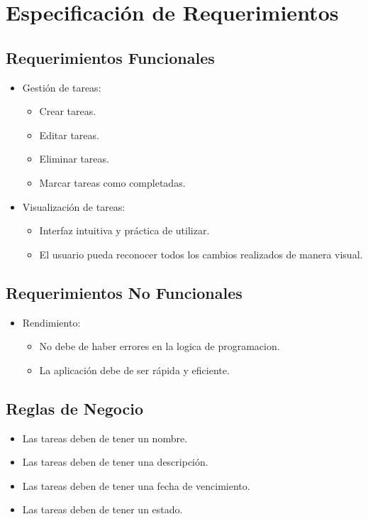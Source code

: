 	\chapter{Especificación de Requerimientos}
	\section{Requerimientos Funcionales}
    \begin{itemize}
        \item Gestión de tareas:
        \begin{itemize}
            \item Crear tareas.
            \item Editar tareas.
            \item Eliminar tareas.
            \item Marcar tareas como completadas.
        \end{itemize}
        \item Visualización de tareas:
        \begin{itemize}
            \item Interfaz intuitiva y práctica de utilizar.
            \item El usuario pueda reconocer todos los cambios realizados de manera visual.
        \end{itemize}
    \end{itemize}
	
	\section{Requerimientos No Funcionales}
	\begin{itemize}
        \item Rendimiento:
        \begin{itemize}
            \item No debe de haber errores en la logica de programacion.
            \item La aplicación debe de ser rápida y eficiente.
        \end{itemize}
    \end{itemize}

    \section{Reglas de Negocio}
    \begin{itemize}
        \item Las tareas deben de tener un nombre.
        \item Las tareas deben de tener una descripción.
        \item Las tareas deben de tener una fecha de vencimiento.
        \item Las tareas deben de tener un estado.
    \end{itemize}

